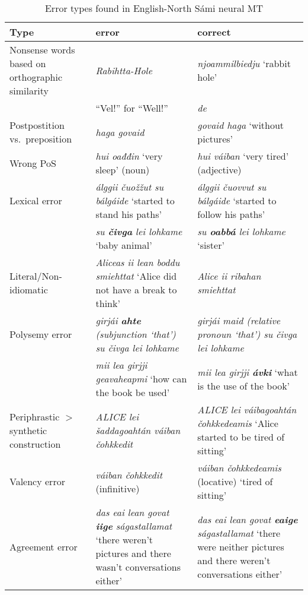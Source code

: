 \documentclass{flammie}
\begin{document}
\begin{table*}[h]
\small
    \centering
    \begin{tabular}{p{4cm}p{5.5cm}p{5.5cm}}
     \bf Type & \bf error & \bf correct \\
      \midrule
     Nonsense words based on orthographic similarity & \textit{Rabihtta-Hole} &
        \textit{njoammilbiedju} `rabbit hole'\\
     & ``Vel!'' for ``Well!'' & \textit{de} \\
     Postpostition vs.\ preposition & \textit{haga govaid} & \textit{govaid haga}
        `without pictures'\\
     Wrong PoS & \textit{hui oađđin} `very sleep' (noun) & \textit{hui váiban}
        `very tired' (adjective)\\
     Lexical error & \textit{álggii čuožžut su bálgáide} `started to stand his
        paths' & \textit{álggii čuovvut su bálgáide} `started to follow his
        paths' \\
      & \textit{su \textbf{čivga} lei lohkame} `baby animal' & \textit{su
        \textbf{oabbá} lei lohkame} `sister' \\
     Literal/Non-idiomatic & \textit{Aliceas ii lean boddu smiehttat} `Alice did
        not have a break to think' & \textit{Alice ii ribahan smiehttat} \\
     Polysemy error & \textit{girjái \textbf{ahte} (subjunction `that') su čivga
        lei lohkame}  & \textit{girjái maid (relative pronoun `that') su čivga
        lei lohkame} \\
     & \textit{mii lea girjji geavaheapmi} `how can the book be used' &
        \textit{mii lea girjji \textbf{ávki}} `what is the use of the book'\\
     Periphrastic $>$ synthetic construction & \textit{ALICE lei šaddagoahtán
        váiban čohkkedit} & \textit{ALICE lei váibagoahtán čohkkedeamis} `Alice
        started to be tired of sitting' \\
    Valency error & \textit{váiban čohkkedit} (infinitive) & \textit{váiban
        čohkkedeamis} (locative) `tired of sitting' \\
     Agreement error & \textit{das eai lean govat \textbf{iige} ságastallamat}
        `there weren't pictures and there wasn't conversations either' &
        \textit{das eai lean govat \textbf{eaige} ságastallamat} `there were
        neither pictures and there weren't conversations either' \\
    \end{tabular}
    \caption{Error types found in English-North Sámi neural
    MT\label{tab:erroro-types}}
\end{table*}
\end{document}

